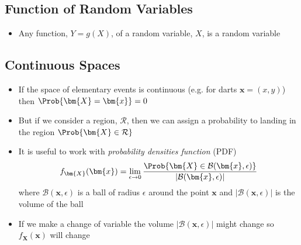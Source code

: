 
\begin{slide}
\section[-1]{Function of Random Variables}

\pb
\begin{itemize}
\item Any function, $Y=g(X)$, of a random variable, $X$, is a random
  variable\pause
\end{itemize}
\begin{center}
  \pause
\end{center}
\end{slide}



\begin{slide}
\section[-2]{Continuous Spaces}

\begin{PauseHighLight}
  \begin{itemize}
  \item If the space of elementary events is continuous (e.g. for darts
    $\bm{x}=(x,y)$) then $\Prob{\bm{X}=\bm{x}}=0$\pause
  \item But if we consider a region, $\mathcal{R}$, then we can assign
    a probability to landing in the region
    $\Prob{\bm{X}\in\mathcal{R}}$\pause
  \item It is useful to work with \emph{probability densities
      function} (PDF)
    \begin{align*}
      f_{\bm{X}}(\bm{x}) = \lim_{\epsilon\rightarrow 0}
      \frac{\Prob{\bm{X}\in\mathcal{B}(\bm{x},
      \epsilon)}}{|\mathcal{B}(\bm{x}, \epsilon)|}
    \end{align*}
    where $\mathcal{B}(\bm{x}, \epsilon)$ is a ball of radius
    $\epsilon$ around the point $\bm{x}$ and
    $|\mathcal{B}(\bm{x}, \epsilon)|$ is the volume of the ball\pause
  \item If we make a change of variable the volume
    $|\mathcal{B}(\bm{x}, \epsilon)|$ might change so
    $f_{\bm{X}}(\bm{x})$ will change\pause
  \end{itemize}
\end{PauseHighLight}

\end{slide}

